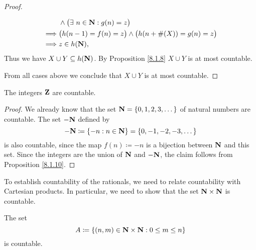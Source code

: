 \begin{proof}
\begin{itemize}
\begin{align*}
                           & \land \big(\exists\ n \in \mathbf{N} : g(n) = z\big)                           \\
                  \implies & \big(h(n - 1) = f(n) = z\big) \land \big(h(n + \#(X)) = g(n) = z\big)  \\
                  \implies & z \in h(\mathbf{N}),
              \end{align*}
              Thus we have \(X \cup Y \subseteq h(\mathbf{N})\).
              By Proposition \ref{8.1.8} \(X \cup Y\) is at most countable.
    \end{itemize}
    From all cases above we conclude that \(X \cup Y\) is at most countable.
\end{proof}

\begin{corollary}\label{8.1.11}
    The integers \(\mathbf{Z}\) are countable.
\end{corollary}

\begin{proof}
    We already know that the set \(\mathbf{N} = \{0, 1, 2, 3, \dots\}\) of natural numbers are countable.
    The set \(-\mathbf{N}\) defined by
    \[
        -\mathbf{N} \coloneqq \{-n : n \in \mathbf{N}\} = \{0, -1, -2, -3, \dots\}
    \]
    is also countable, since the map \(f(n) \coloneqq -n\) is a bijection between \(\mathbf{N}\) and this set.
    Since the integers are the union of \(\mathbf{N}\) and \(-\mathbf{N}\), the claim follows from Proposition \ref{8.1.10}.
\end{proof}

\begin{note}
    To establish countability of the rationals, we need to relate countability with Cartesian products.
    In particular, we need to show that the set \(\mathbf{N} \times \mathbf{N}\) is countable.
\end{note}

\begin{lemma}\label{8.1.12}
    The set
    \[
        A \coloneqq \{(n, m) \in \mathbf{N} \times \mathbf{N} : 0 \leq m \leq n\}
    \]
    is countable.
\end{lemma}

